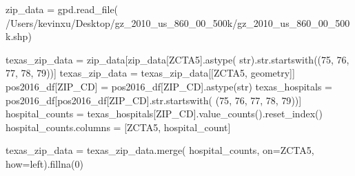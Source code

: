 \documentclass[
  letterpaper,
  DIV=11,
  numbers=noendperiod]{scrartcl}
\newenvironment{Shaded}{\begin{snugshade}}{\end{snugshade}}
\newcommand{\BuiltInTok}[1]{\textcolor[rgb]{0.00,0.23,0.31}{#1}}
\newcommand{\DecValTok}[1]{\textcolor[rgb]{0.68,0.00,0.00}{#1}}
\newcommand{\NormalTok}[1]{\textcolor[rgb]{0.00,0.23,0.31}{#1}}
\newcommand{\OperatorTok}[1]{\textcolor[rgb]{0.37,0.37,0.37}{#1}}
\newcommand{\StringTok}[1]{\textcolor[rgb]{0.13,0.47,0.30}{#1}}
\begin{document}
\begin{Shaded}
\begin{Highlighting}[]
\NormalTok{zip\_data }\OperatorTok{=}\NormalTok{ gpd.read\_file(}
    \StringTok{\textquotesingle{}/Users/kevinxu/Desktop/gz\_2010\_us\_860\_00\_500k/gz\_2010\_us\_860\_00\_500k.shp\textquotesingle{}}\NormalTok{)}

\NormalTok{texas\_zip\_data }\OperatorTok{=}\NormalTok{ zip\_data[zip\_data[}\StringTok{\textquotesingle{}ZCTA5\textquotesingle{}}\NormalTok{].astype(}
    \BuiltInTok{str}\NormalTok{).}\BuiltInTok{str}\NormalTok{.startswith((}\StringTok{\textquotesingle{}75\textquotesingle{}}\NormalTok{, }\StringTok{\textquotesingle{}76\textquotesingle{}}\NormalTok{, }\StringTok{\textquotesingle{}77\textquotesingle{}}\NormalTok{, }\StringTok{\textquotesingle{}78\textquotesingle{}}\NormalTok{, }\StringTok{\textquotesingle{}79\textquotesingle{}}\NormalTok{))]}
\NormalTok{texas\_zip\_data }\OperatorTok{=}\NormalTok{ texas\_zip\_data[[}\StringTok{\textquotesingle{}ZCTA5\textquotesingle{}}\NormalTok{, }\StringTok{\textquotesingle{}geometry\textquotesingle{}}\NormalTok{]]}
\NormalTok{pos2016\_df[}\StringTok{\textquotesingle{}ZIP\_CD\textquotesingle{}}\NormalTok{] }\OperatorTok{=}\NormalTok{ pos2016\_df[}\StringTok{\textquotesingle{}ZIP\_CD\textquotesingle{}}\NormalTok{].astype(}\BuiltInTok{str}\NormalTok{)}
\NormalTok{texas\_hospitals }\OperatorTok{=}\NormalTok{ pos2016\_df[pos2016\_df[}\StringTok{\textquotesingle{}ZIP\_CD\textquotesingle{}}\NormalTok{].}\BuiltInTok{str}\NormalTok{.startswith(}
\NormalTok{    (}\StringTok{\textquotesingle{}75\textquotesingle{}}\NormalTok{, }\StringTok{\textquotesingle{}76\textquotesingle{}}\NormalTok{, }\StringTok{\textquotesingle{}77\textquotesingle{}}\NormalTok{, }\StringTok{\textquotesingle{}78\textquotesingle{}}\NormalTok{, }\StringTok{\textquotesingle{}79\textquotesingle{}}\NormalTok{))]}
\NormalTok{hospital\_counts }\OperatorTok{=}\NormalTok{ texas\_hospitals[}\StringTok{\textquotesingle{}ZIP\_CD\textquotesingle{}}\NormalTok{].value\_counts().reset\_index()}
\NormalTok{hospital\_counts.columns }\OperatorTok{=}\NormalTok{ [}\StringTok{\textquotesingle{}ZCTA5\textquotesingle{}}\NormalTok{, }\StringTok{\textquotesingle{}hospital\_count\textquotesingle{}}\NormalTok{]}

\NormalTok{texas\_zip\_data }\OperatorTok{=}\NormalTok{ texas\_zip\_data.merge(}
\NormalTok{    hospital\_counts, on}\OperatorTok{=}\StringTok{\textquotesingle{}ZCTA5\textquotesingle{}}\NormalTok{, how}\OperatorTok{=}\StringTok{\textquotesingle{}left\textquotesingle{}}\NormalTok{).fillna(}\DecValTok{0}\NormalTok{)}


\end{Highlighting}
\end{Shaded}
\end{document}
